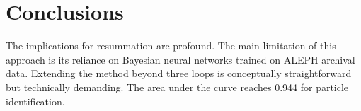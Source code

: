 \section{Conclusions}\label{sec:conclusions}

The implications for resummation are profound. The main limitation of
this approach is its reliance on Bayesian neural networks trained on
ALEPH archival data. Extending the method beyond three loops is
conceptually straightforward but technically demanding. The area under
the curve reaches 0.944 for particle identification.

